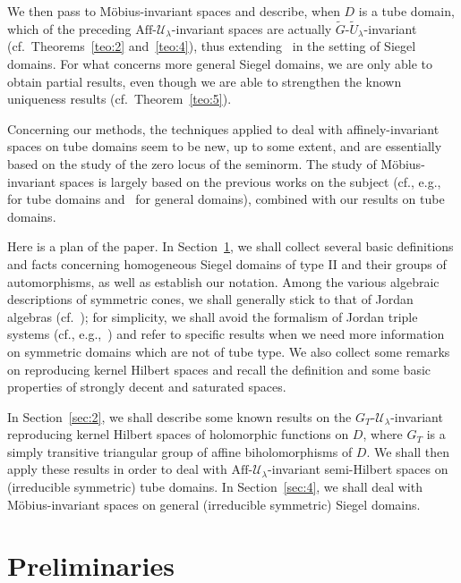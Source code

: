 \documentclass[10.5pt,reqno]{amsart}
\newcommand{\Aff}{\mathrm{Aff}}
\newcommand{\Uc}{\mathcal{U}}
\begin{document}
We then pass to M\"obius-invariant spaces and describe, when $D$ is a tube domain, which of the preceding $\Aff$-$\Uc_\lambda$-invariant spaces are actually $\widetilde G$-$\widetilde U_\lambda$-invariant (cf.~Theorems~\ref{teo:2} and~\ref{teo:4}), thus extending~\cite{Garrigos} in the setting of Siegel domains. For what concerns more general Siegel domains, we are only able to obtain partial results, even though we are able to strengthen  the known uniqueness results (cf.~Theorem~\ref{teo:5}).

Concerning our methods, the techniques applied to deal with affinely-invariant spaces on tube domains  seem to be new, up to some extent, and are essentially based on the study of the zero locus of the seminorm. The study of M\"obius-invariant spaces is largely based on the previous works on the subject (cf., e.g.,~\cite{Garrigos} for tube domains and~\cite{ArazyFisher2,Arazy} for general domains), combined with our results on tube domains.

\medskip

Here is a plan of the paper. In Section~\ref{sec:1}, we shall collect several basic definitions and facts concerning homogeneous Siegel domains of type II and their groups of automorphisms, as well as establish our notation. Among the various algebraic descriptions of symmetric  cones, we shall generally stick to that of Jordan algebras (cf.~\cite{FarautKoranyi}); for simplicity, we shall avoid the formalism of Jordan triple systems (cf., e.g.,~\cite{Loos}) and refer to specific results when we need more information on symmetric domains which are not of tube type.  We also collect some remarks on reproducing kernel Hilbert spaces and recall the definition and some basic properties of strongly decent and saturated spaces.



In Section~\ref{sec:2}, we shall describe some known results on the $G_T$-$\Uc_\lambda$-invariant reproducing kernel Hilbert spaces of holomorphic functions on $D$, where $G_T$ is a simply transitive triangular group of affine biholomorphisms of $D$. We shall then apply these results in order to deal with $\Aff$-$\Uc_\lambda$-invariant semi-Hilbert spaces on (irreducible symmetric) tube domains. 
In Section~\ref{sec:4}, we shall deal with M\"obius-invariant spaces on general (irreducible symmetric) Siegel domains.





\section{Preliminaries}\label{sec:1}
\end{document}
